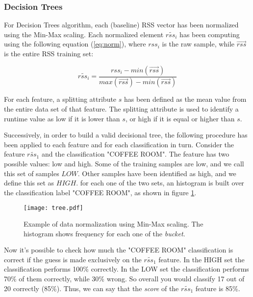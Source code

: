 
\subsubsection{Decision Trees}
\label{subsubsec:trees}
For Decision Trees algorithm, each (baseline) RSS vector has been normalized using the Min-Max scaling. Each normalized element $\widetilde{rss_i}$ has been computing using the following equation (\ref{eq:norm}), where $rss_i$ is the raw sample, while $\vec{rss}$ is the entire RSS training set:

\begin{equation}\label{eq:norm}
\widetilde{rss_i} = \frac{rss_i - min(\vec{rss})}{max(\vec{rss}) - min(\vec{rss})}
\end{equation}

For each feature, a splitting attribute $s$ has been defined as the mean value from the entire data set of that feature. The splitting attribute is used to identify a runtime value as low if it is lower than $s$, or high if it is equal or higher than $s$.

Successively, in order to build a valid decisional tree, the following procedure has been applied to each feature and for each classification in turn. Consider the feature $\widetilde{rss_1}$ and the classification "COFFEE ROOM". The feature has two possible values: low and high. Some of the training samples are low, and we call this set of samples $LOW$. Other samples have been identified as high, and we define this set as $HIGH$. for each one of the two sets, an histogram is built over the classification label "COFFEE ROOM", as shown in figure \ref{fig:tree}.

\begin{figure}[h!tb]
\centering
\texttt{[image: tree.pdf]}
\caption[Example of data normalization using Min-Max scaling.]{Example of data normalization using Min-Max scaling. The histogram shows frequency for each one of the \emph{bucket}.}
\label{fig:tree}
\end{figure}

 Now it's possible to check how much the "COFFEE ROOM" classification is correct if the guess is made exclusively on the $\widetilde{rss_1}$ feature.
In the HIGH set the classification performs 100\% correctly. In the LOW set the classification performs 70\% of them correctly, while 30\% wrong. So overall you would classify 17 out of 20 correctly (85\%). Thus, we can say that the \emph{score} of the $\widetilde{rss_1}$ feature is 85\%. 

